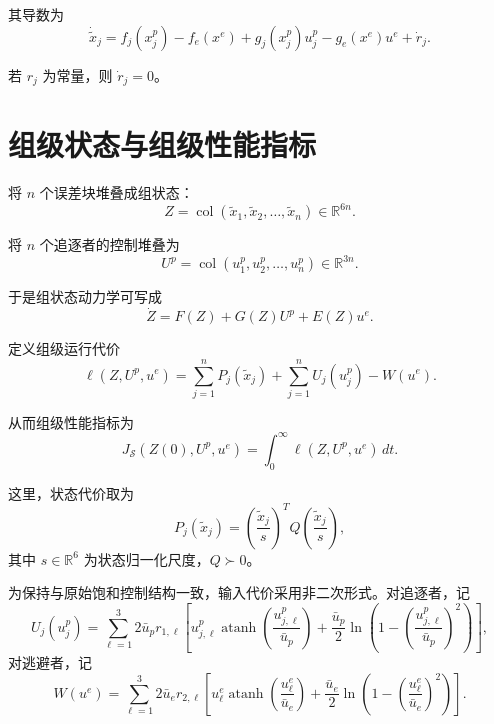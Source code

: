﻿\documentclass[12pt,a4paper]{ctexart}
\begin{document}
其导数为
\begin{equation}
    \dot{\tilde x}_j
    =
    f_j(x_j^p)-f_e(x^e)
    +g_j(x_j^p)u_j^p
    -g_e(x^e)u^e
    +\dot r_j.
\end{equation}

若 $r_j$ 为常量，则 $\dot r_j=0$。

\section{组级状态与组级性能指标}

将 $n$ 个误差块堆叠成组状态：
\begin{equation}
    Z = \operatorname{col}(\tilde x_1,\tilde x_2,\dots,\tilde x_n)\in\mathbb{R}^{6n}.
\end{equation}

将 $n$ 个追逐者的控制堆叠为
\begin{equation}
    U^p = \operatorname{col}(u_1^p,u_2^p,\dots,u_n^p)\in\mathbb{R}^{3n}.
\end{equation}

于是组状态动力学可写成
\begin{equation}
    \dot Z = F(Z)+G(Z)U^p+E(Z)u^e.
\end{equation}

定义组级运行代价
\begin{equation}
    \ell(Z,U^p,u^e)
    =
    \sum_{j=1}^n P_j(\tilde x_j)
    +
    \sum_{j=1}^n U_j(u_j^p)
    -W(u^e).
\end{equation}

从而组级性能指标为
\begin{equation}
    J_{\mathcal S}(Z(0),U^p,u^e)
    =
    \int_0^{\infty} \ell(Z,U^p,u^e)\,dt.
\end{equation}

这里，状态代价取为
\begin{equation}
    P_j(\tilde x_j)
    =
    \left(\frac{\tilde x_j}{s}\right)^T Q \left(\frac{\tilde x_j}{s}\right),
\end{equation}
其中 $s\in\mathbb{R}^6$ 为状态归一化尺度，$Q\succ 0$。

为保持与原始饱和控制结构一致，输入代价采用非二次形式。对追逐者，记
\begin{equation}
    U_j(u_j^p)
    =
    \sum_{\ell=1}^{3}
    2\bar u_p r_{1,\ell}
    \left[
    u_{j,\ell}^p\operatorname{atanh}\!\left(\frac{u_{j,\ell}^p}{\bar u_p}\right)
    +
    \frac{\bar u_p}{2}\ln\!\left(1-\left(\frac{u_{j,\ell}^p}{\bar u_p}\right)^2\right)
    \right],
\end{equation}
对逃避者，记
\begin{equation}
    W(u^e)
    =
    \sum_{\ell=1}^{3}
    2\bar u_e r_{2,\ell}
    \left[
    u_{\ell}^e\operatorname{atanh}\!\left(\frac{u_{\ell}^e}{\bar u_e}\right)
    +
    \frac{\bar u_e}{2}\ln\!\left(1-\left(\frac{u_{\ell}^e}{\bar u_e}\right)^2\right)
    \right].
\end{equation}
\end{document}
